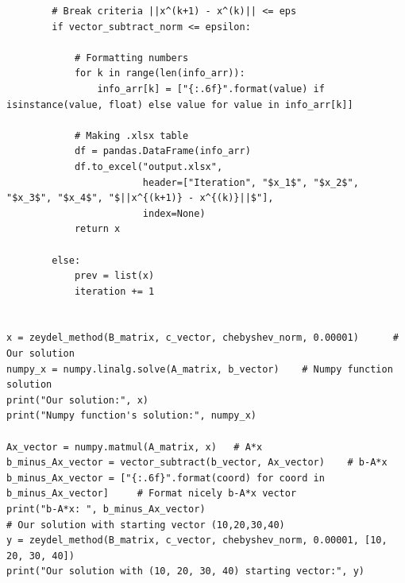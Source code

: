 \documentclass[14 pt]{extarticle}
\begin{document}
\begin{verbatim}
        # Break criteria ||x^(k+1) - x^(k)|| <= eps
        if vector_subtract_norm <= epsilon:

            # Formatting numbers
            for k in range(len(info_arr)):
                info_arr[k] = ["{:.6f}".format(value) if isinstance(value, float) else value for value in info_arr[k]]

            # Making .xlsx table
            df = pandas.DataFrame(info_arr)
            df.to_excel("output.xlsx",
                        header=["Iteration", "$x_1$", "$x_2$", "$x_3$", "$x_4$", "$||x^{(k+1)} - x^{(k)}||$"],
                        index=None)
            return x

        else:
            prev = list(x)
            iteration += 1


x = zeydel_method(B_matrix, c_vector, chebyshev_norm, 0.00001)      # Our solution
numpy_x = numpy.linalg.solve(A_matrix, b_vector)    # Numpy function solution
print("Our solution:", x)
print("Numpy function's solution:", numpy_x)

Ax_vector = numpy.matmul(A_matrix, x)   # A*x
b_minus_Ax_vector = vector_subtract(b_vector, Ax_vector)    # b-A*x
b_minus_Ax_vector = ["{:.6f}".format(coord) for coord in b_minus_Ax_vector]     # Format nicely b-A*x vector
print("b-A*x: ", b_minus_Ax_vector)
# Our solution with starting vector (10,20,30,40)
y = zeydel_method(B_matrix, c_vector, chebyshev_norm, 0.00001, [10, 20, 30, 40])
print("Our solution with (10, 20, 30, 40) starting vector:", y)

\end{verbatim}
\end{document}
